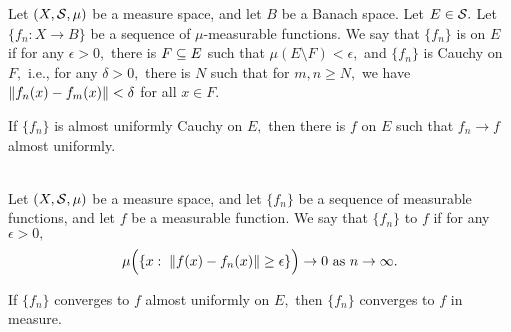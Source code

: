 \begin{defn}
Let $(X,\mathcal{S},\mu)$ be a measure space, and let $B$ be a Banach space. Let $E\in\mathcal{S}.$ Let $\{f_n:X\rightarrow B\}$ be a sequence of $\mu$-measurable functions. We say that $\{f_n\}$ is  on $E$ if for any $\epsilon>0,$ there is $F\subseteq E$ such that $\mu(E\setminus F)<\epsilon,$ and $\{f_n\}$ is Cauchy on $F,$ i.e., for any $\delta>0,$ there is $N$ such that for $m,n\geq N,$ we have $\left\lVert f_n(x)-f_m(x)\right\rVert<\delta$ for all $x\in F.$
\end{defn}

\begin{prop}
If $\{f_n\}$ is almost uniformly Cauchy on $E,$ then there is $f$ on $E$ such that $f_n\rightarrow f$ almost uniformly. \\ \\
\end{prop}

\begin{defn}
Let $(X,\mathcal{S},\mu)$ be a measure space, and let $\{f_n\}$ be a sequence of measurable functions, and let $f$ be a measurable function. We say that $\{f_n\}$  to $f$ if for any $\epsilon>0,$
$$\mu\Big(\{x:\;\left\lVert f(x)-f_n(x)\right\rVert\geq\epsilon\}\Big)\rightarrow 0\text{ as }n\rightarrow\infty.$$
\end{defn}

\begin{prop}
If $\{f_n\}$ converges to $f$ almost uniformly on $E,$ then $\{f_n\}$ converges to $f$ in measure. \\ \\
\end{prop}

